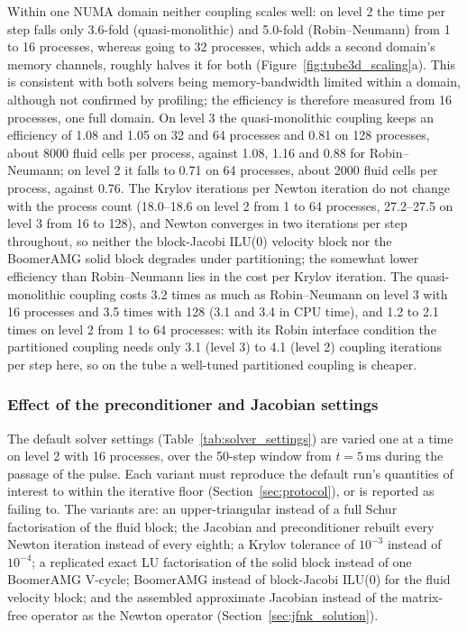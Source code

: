 Within one NUMA domain neither coupling scales well: on level 2 the time per step falls only 3.6-fold (quasi-monolithic) and 5.0-fold (Robin--Neumann) from 1 to 16 processes, whereas going to 32 processes, which adds a second domain's memory channels, roughly halves it for both (Figure~\ref{fig:tube3d_scaling}a).
This is consistent with both solvers being memory-bandwidth limited within a domain, although not confirmed by profiling; the efficiency is therefore measured from 16 processes, one full domain.
On level 3 the quasi-monolithic coupling keeps an efficiency of 1.08 and 1.05 on 32 and 64 processes and 0.81 on 128 processes, about 8000 fluid cells per process, against 1.08, 1.16 and 0.88 for Robin--Neumann; on level 2 it falls to 0.71 on 64 processes, about 2000 fluid cells per process, against 0.76.
The Krylov iterations per Newton iteration do not change with the process count (18.0--18.6 on level 2 from 1 to 64 processes, 27.2--27.5 on level 3 from 16 to 128), and Newton converges in two iterations per step throughout, so neither the block-Jacobi ILU(0) velocity block nor the BoomerAMG solid block degrades under partitioning; the somewhat lower efficiency than Robin--Neumann lies in the cost per Krylov iteration.
The quasi-monolithic coupling costs 3.2 times as much as Robin--Neumann on level 3 with 16 processes and 3.5 times with 128 (3.1 and 3.4 in CPU time), and 1.2 to 2.1 times on level 2 from 1 to 64 processes: with its Robin interface condition the partitioned coupling needs only 3.1 (level 3) to 4.1 (level 2) coupling iterations per step here, so on the tube a well-tuned partitioned coupling is cheaper.

\subsubsection{Effect of the preconditioner and Jacobian settings}\label{sec:tube3d_pc_study}

The default solver settings (Table~\ref{tab:solver_settings}) are varied one at a time on level 2 with 16 processes, over the 50-step window from $t = 5\,\mathrm{ms}$ during the passage of the pulse.
Each variant must reproduce the default run's quantities of interest to within the iterative floor (Section~\ref{sec:protocol}), or is reported as failing to.
The variants are: an upper-triangular instead of a full Schur factorisation of the fluid block; the Jacobian and preconditioner rebuilt every Newton iteration instead of every eighth; a Krylov tolerance of $10^{-3}$ instead of $10^{-4}$; a replicated exact LU factorisation of the solid block instead of one BoomerAMG V-cycle; BoomerAMG instead of block-Jacobi ILU(0) for the fluid velocity block; and the assembled approximate Jacobian instead of the matrix-free operator as the Newton operator (Section~\ref{sec:jfnk_solution}).

